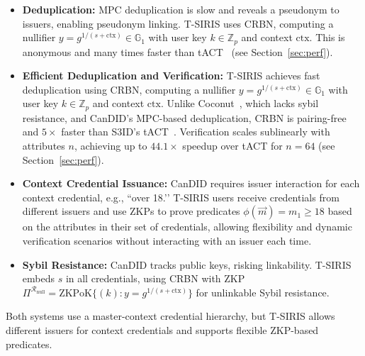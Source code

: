 \begin{itemize}
    \item \textbf{Deduplication:} MPC deduplication is slow and reveals a pseudonym to issuers, enabling pseudonym linking. T-SIRIS uses CRBN, computing a nullifier $y = g^{1/(s + \text{ctx})} \in \mathbb{G}_1$ with user key $k \in \mathbb{Z}_p$ and context $\text{ctx}$. This is anonymous and many times faster than tACT~\cite{rabaninejad_attribute-based_2024} (see Section~\ref{sec:perf}).

    \item \textbf{Efficient Deduplication and Verification:} T-SIRIS achieves fast deduplication using CRBN, computing a nullifier $y = g^{1/(s + \text{ctx})} \in \mathbb{G}_1$ with user key $k \in \mathbb{Z}_p$ and context $\text{ctx}$. Unlike Coconut~\cite{sonnino_coconut_2020}, which lacks sybil resistance, and CanDID’s MPC-based deduplication, CRBN is pairing-free and $5\times$ faster than S3ID’s tACT~\cite{rabaninejad_attribute-based_2024}. Verification scales sublinearly with attributes $n$, achieving up to $44.1\times$ speedup over tACT for $n=64$ (see Section~\ref{sec:perf}).
    
    \item \textbf{Context Credential Issuance:} CanDID requires issuer interaction for each context credential, e.g., ``over 18.’’ T-SIRIS users receive credentials from different issuers and use ZKPs to prove predicates $\phi(\vec{m}) = m_1 \geq 18$ based on the attributes in their set of credentials, allowing flexibility and dynamic verification scenarios without interacting with an issuer each time. 
    
    \item \textbf{Sybil Resistance:} CanDID tracks public keys, risking linkability. T-SIRIS embeds $s$ in all credentials, using CRBN with ZKP $\Pi^{\mathcal{R}_{\text{null}}} = \text{ZKPoK}\{(k): y = g^{1/(s + \text{ctx})}\}$ for unlinkable Sybil resistance.
\end{itemize}

Both systems use a master-context credential hierarchy, but T-SIRIS allows different issuers for context credentials and supports flexible ZKP-based predicates.

